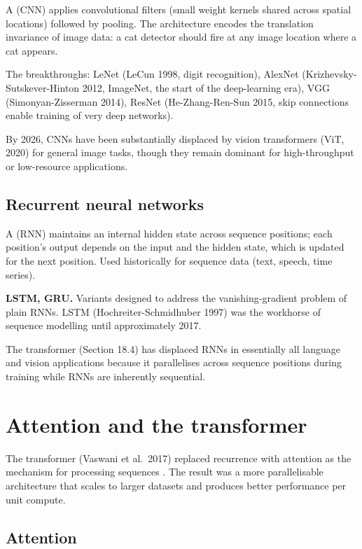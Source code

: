 A  (CNN) applies convolutional filters (small weight kernels shared across spatial locations) followed by pooling. The architecture encodes the translation invariance of image data: a cat detector should fire at any image location where a cat appears.

The breakthroughs: LeNet (LeCun 1998, digit recognition), AlexNet (Krizhevsky-Sutskever-Hinton 2012, ImageNet, the start of the deep-learning era), VGG (Simonyan-Zisserman 2014), ResNet (He-Zhang-Ren-Sun 2015, skip connections enable training of very deep networks).

By 2026, CNNs have been substantially displaced by vision transformers (ViT, 2020) for general image tasks, though they remain dominant for high-throughput or low-resource applications.

\subsection{Recurrent neural networks}

A  (RNN) maintains an internal hidden state across sequence positions; each position's output depends on the input and the hidden state, which is updated for the next position. Used historically for sequence data (text, speech, time series).

\textbf{LSTM, GRU.} Variants designed to address the vanishing-gradient problem of plain RNNs. LSTM (Hochreiter-Schmidhuber 1997) was the workhorse of sequence modelling until approximately 2017.

The transformer (Section 18.4) has displaced RNNs in essentially all language and vision applications because it parallelises across sequence positions during training while RNNs are inherently sequential.

\section{Attention and the transformer}

The transformer (Vaswani et al.\ 2017) replaced recurrence with attention as the mechanism for processing sequences \cite{paper:vaswani-attention-2017}. The result was a more parallelisable architecture that scales to larger datasets and produces better performance per unit compute.

\subsection{Attention}

